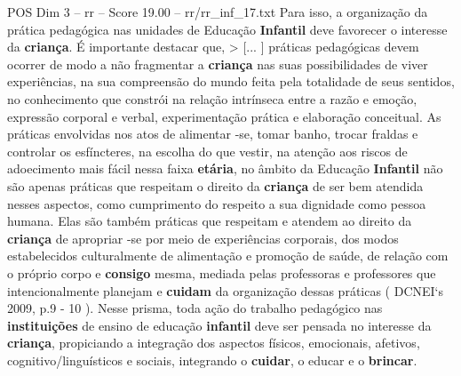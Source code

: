 \begin{textsample}{POS Dim 3 – rr – Score 19.00 – rr/rr\_inf\_17.txt}
Para isso, a organização da prática pedagógica nas unidades de Educação \textbf{Infantil} deve favorecer o interesse da \textbf{criança}.
É importante destacar que, > [... ] práticas pedagógicas devem ocorrer de modo a não fragmentar a \textbf{criança} nas suas possibilidades de viver experiências, na sua compreensão do mundo feita pela totalidade de seus sentidos, no conhecimento que constrói na relação intrínseca entre a razão e emoção, expressão corporal e verbal, experimentação prática e elaboração conceitual.
As práticas envolvidas nos atos de alimentar -se, tomar banho, trocar fraldas e controlar os esfíncteres, na escolha do que vestir, na atenção aos riscos de adoecimento mais fácil nessa faixa \textbf{etária}, no âmbito da Educação \textbf{Infantil} não são apenas práticas que respeitam o direito da \textbf{criança} de ser bem atendida nesses aspectos, como cumprimento do respeito a sua dignidade como pessoa humana.
Elas são também práticas que respeitam e atendem ao direito da \textbf{criança} de apropriar -se por meio de experiências corporais, dos modos estabelecidos culturalmente de alimentação e promoção de saúde, de relação com o próprio corpo e \textbf{consigo} mesma, mediada pelas professoras e professores que intencionalmente planejam e \textbf{cuidam} da organização dessas práticas ( DCNEI‘s 2009, p.9 - 10 ).
Nesse prisma, toda ação do trabalho pedagógico nas \textbf{instituições} de ensino de educação \textbf{infantil} deve ser pensada no interesse da \textbf{criança}, propiciando a integração dos aspectos físicos, emocionais, afetivos, cognitivo/linguísticos e sociais, integrando o \textbf{cuidar}, o educar e o \textbf{brincar}.

\end{textsample}
